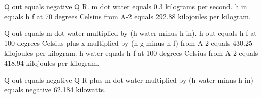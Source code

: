 Q out equals negative Q R.  
m dot water equals 0.3 kilograms per second.  
h in equals h f at 70 degrees Celsius from A-2 equals 292.88 kilojoules per kilogram.  

Q out equals m dot water multiplied by (h water minus h in).  
h out equals h f at 100 degrees Celsius plus x multiplied by (h g minus h f) from A-2 equals 430.25 kilojoules per kilogram.  
h water equals h f at 100 degrees Celsius from A-2 equals 418.94 kilojoules per kilogram.  

Q out equals negative Q R plus m dot water multiplied by (h water minus h in) equals negative 62.184 kilowatts.